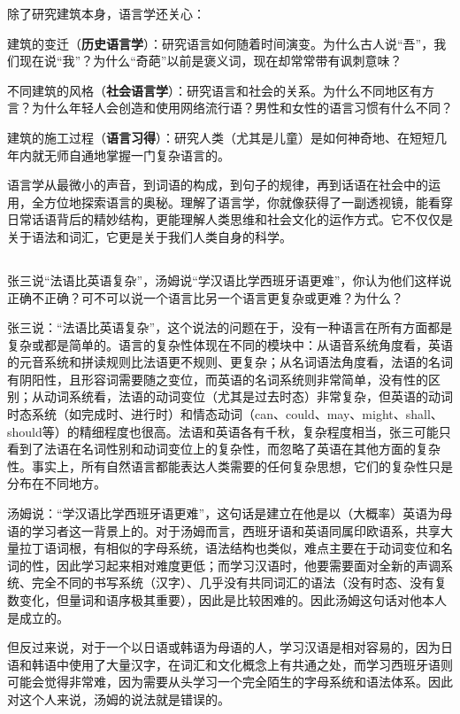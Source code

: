 \documentclass[10pt]{ctexart}
\begin{document}
除了研究建筑本身，语言学还关心：

建筑的变迁（\textbf{历史语言学}）：研究语言如何随着时间演变。为什么古人说``吾''，我们现在说``我''？为什么``奇葩''以前是褒义词，现在却常常带有讽刺意味？

不同建筑的风格（\textbf{社会语言学}）：研究语言和社会的关系。为什么不同地区有方言？为什么年轻人会创造和使用网络流行语？男性和女性的语言习惯有什么不同？

建筑的施工过程（\textbf{语言习得}）：研究人类（尤其是儿童）是如何神奇地、在短短几年内就无师自通地掌握一门复杂语言的。

语言学从最微小的声音，到词语的构成，到句子的规律，再到话语在社会中的运用，全方位地探索语言的奥秘。理解了语言学，你就像获得了一副透视镜，能看穿日常话语背后的精妙结构，更能理解人类思维和社会文化的运作方式。它不仅仅是关于语法和词汇，它更是关于我们人类自身的科学。

\subsection{}
{\heiti
张三说``法语比英语复杂''，汤姆说``学汉语比学西班牙语更难''，你认为他们这样说正确不正确？可不可以说一个语言比另一个语言更复杂或更难？为什么？
}

\vspace{0.5cm}

张三说：``法语比英语复杂''，这个说法的问题在于，没有一种语言在所有方面都是复杂或都是简单的。语言的复杂性体现在不同的模块中：从语音系统角度看，英语的元音系统和拼读规则比法语更不规则、更复杂；从名词语法角度看，法语的名词有阴阳性，且形容词需要随之变位，而英语的名词系统则非常简单，没有性的区别；从动词系统看，法语的动词变位（尤其是过去时态）非常复杂，但英语的动词时态系统（如完成时、进行时）和情态动词（can、could、may、might、shall、should等）的精细程度也很高。法语和英语各有千秋，复杂程度相当，张三可能只看到了法语在名词性别和动词变位上的复杂性，而忽略了英语在其他方面的复杂性。事实上，所有自然语言都能表达人类需要的任何复杂思想，它们的复杂性只是分布在不同地方。

汤姆说：``学汉语比学西班牙语更难''，这句话是建立在他是以（大概率）英语为母语的学习者这一背景上的。对于汤姆而言，西班牙语和英语同属印欧语系，共享大量拉丁语词根，有相似的字母系统，语法结构也类似，难点主要在于动词变位和名词的性，因此学习起来相对难度更低；而学习汉语时，他要需要面对全新的声调系统、完全不同的书写系统（汉字）、几乎没有共同词汇的语法（没有时态、没有复数变化，但量词和语序极其重要），因此是比较困难的。因此汤姆这句话对他本人是成立的。

但反过来说，对于一个以日语或韩语为母语的人，学习汉语是相对容易的，因为日语和韩语中使用了大量汉字，在词汇和文化概念上有共通之处，而学习西班牙语则可能会觉得非常难，因为需要从头学习一个完全陌生的字母系统和语法体系。因此对这个人来说，汤姆的说法就是错误的。
\end{document}

